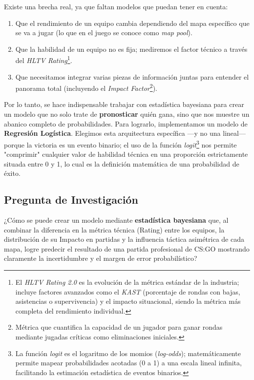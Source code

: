 \documentclass[twocolumn,10pt]{article}
\begin{document}
Existe una brecha real, ya que faltan modelos que puedan tener en cuenta:
\begin{enumerate}[noitemsep]
    \item Que el rendimiento de un equipo cambia dependiendo del mapa específico que se va a jugar (lo que en el juego se conoce como \textit{map pool}).
    \item Que la habilidad de un equipo no es fija; mediremos el factor técnico a través del \textit{HLTV Rating}\footnote{El \textit{HLTV Rating 2.0} es la evolución de la métrica estándar de la industria; incluye factores avanzados como el \textit{KAST} (porcentaje de rondas con bajas, asistencias o supervivencia) y el impacto situacional, siendo la métrica más completa del rendimiento individual.}.
    \item Que necesitamos integrar varias piezas de información juntas para entender el panorama total (incluyendo el \textit{Impact Factor}\footnote{Métrica que cuantifica la capacidad de un jugador para ganar rondas mediante jugadas críticas como eliminaciones iniciales.}).
\end{enumerate}

Por lo tanto, se hace indispensable trabajar con estadística bayesiana para crear un modelo que no solo trate de \textbf{pronosticar} quién gana, sino que nos muestre un abanico completo de probabilidades. Para lograrlo, implementamos un modelo de \textbf{Regresión Logística}. Elegimos esta arquitectura específica —y no una lineal— porque la victoria es un evento binario; el uso de la función \textit{logit}\footnote{La función \textit{logit} es el logaritmo de los momios (\textit{log-odds}); matemáticamente permite mapear probabilidades acotadas (0 a 1) a una escala lineal infinita, facilitando la estimación estadística de eventos binarios.} nos permite "comprimir" cualquier valor de habilidad técnica en una proporción estrictamente situada entre 0 y 1, lo cual es la definición matemática de una probabilidad de éxito.

\subsection{Pregunta de Investigación}

¿Cómo se puede crear un modelo mediante \textbf{estadística bayesiana} que, al combinar la diferencia en la métrica técnica (Rating) entre los equipos, la distribución de su Impacto en partidas y la influencia táctica asimétrica de cada mapa, logre predecir el resultado de una partida profesional de CS:GO mostrando claramente la incertidumbre y el margen de error probabilístico?
\end{document}
